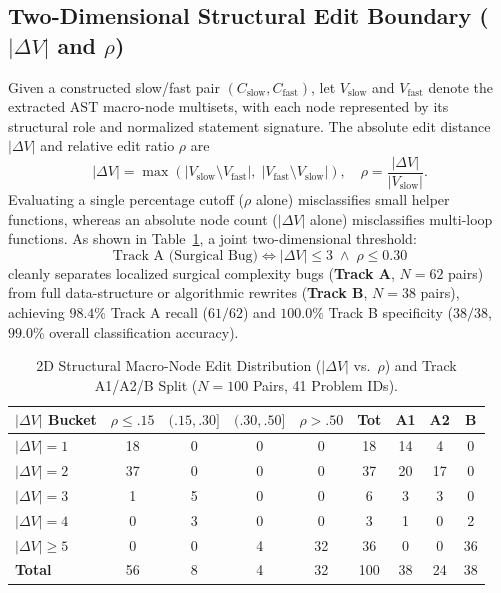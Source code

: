 \subsection{Two-Dimensional Structural Edit Boundary ($|\Delta V|$ and $\rho$)}
Given a constructed slow/fast pair $(C_{\text{slow}}, C_{\text{fast}})$, let $V_{\text{slow}}$ and $V_{\text{fast}}$ denote the extracted AST macro-node multisets, with each node represented by its structural role and normalized statement signature. The absolute edit distance $|\Delta V|$ and relative edit ratio $\rho$ are
\begin{equation}
|\Delta V| = \max\!\left(|V_{\text{slow}} \setminus V_{\text{fast}}|,\; |V_{\text{fast}} \setminus V_{\text{slow}}|\right), \quad \rho = \frac{|\Delta V|}{|V_{\text{slow}}|}.
\end{equation}
Evaluating a single percentage cutoff ($\rho$ alone) misclassifies small helper functions, whereas an absolute node count ($|\Delta V|$ alone) misclassifies multi-loop functions. As shown in Table~\ref{tab:pilot_edit_dist}, a joint two-dimensional threshold:
\begin{equation}
\text{Track A (Surgical Bug)} \iff |\Delta V| \le 3 \;\land\; \rho \le 0.30
\end{equation}
cleanly separates localized surgical complexity bugs (\textbf{Track A}, $N=62$ pairs) from full data-structure or algorithmic rewrites (\textbf{Track B}, $N=38$ pairs), achieving $98.4\%$ Track A recall ($61/62$) and $100.0\%$ Track B specificity ($38/38$, $99.0\%$ overall classification accuracy).

\begin{table}[t]
\centering
\caption{2D Structural Macro-Node Edit Distribution ($|\Delta V|$ vs.\ $\rho$) and Track A1/A2/B Split ($N=100$ Pairs, 41 Problem IDs).}
\label{tab:pilot_edit_dist}
\setlength{\tabcolsep}{2.5pt}
\begin{tabular}{@{}lcccccccc@{}}
\toprule
\textbf{$|\Delta V|$ Bucket} & \textbf{$\rho \le .15$} & \textbf{$(.15, .30]$} & \textbf{$(.30, .50]$} & \textbf{$\rho > .50$} & \textbf{Tot} & \textbf{A1} & \textbf{A2} & \textbf{B} \\
\midrule
$|\Delta V| = 1$ & 18 & 0 & 0 & 0 & 18 & 14 & 4 & 0 \\
$|\Delta V| = 2$ & 37 & 0 & 0 & 0 & 37 & 20 & 17 & 0 \\
$|\Delta V| = 3$ & 1 & 5 & 0 & 0 & 6 & 3 & 3 & 0 \\
$|\Delta V| = 4$ & 0 & 3 & 0 & 0 & 3 & 1 & 0 & 2 \\
$|\Delta V| \ge 5$ & 0 & 0 & 4 & 32 & 36 & 0 & 0 & 36 \\
\midrule
\textbf{Total} & 56 & 8 & 4 & 32 & 100 & 38 & 24 & 38 \\
\bottomrule
\end{tabular}
\end{table}

